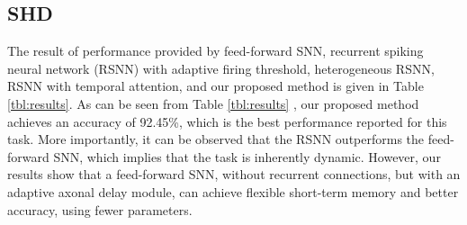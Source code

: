 \documentclass{article}
\begin{document}
\begin{table*}[ht]
\small
\vspace{-0.8cm}
	\centering
	\caption{Comparison with the state-of-the-art in terms of network size and accuracy.}
	\label{tbl:results}
	\vspace{-0.5cm}
\end{table*}


\subsection{SHD}
The result of performance provided by feed-forward SNN, recurrent spiking neural network (RSNN) with adaptive firing threshold, heterogeneous RSNN, RSNN with temporal attention, and our proposed method is given in Table \ref{tbl:results}. As can be seen from Table \ref{tbl:results} , our proposed method achieves an accuracy of 92.45\%, which is the best performance reported for this task. More importantly, it can be observed that the RSNN outperforms the feed-forward SNN, which implies that the task is inherently dynamic. However, our results show that a feed-forward SNN, without recurrent connections, but with an adaptive axonal delay module, can achieve flexible short-term memory and better accuracy, using fewer parameters. 
\end{document}

